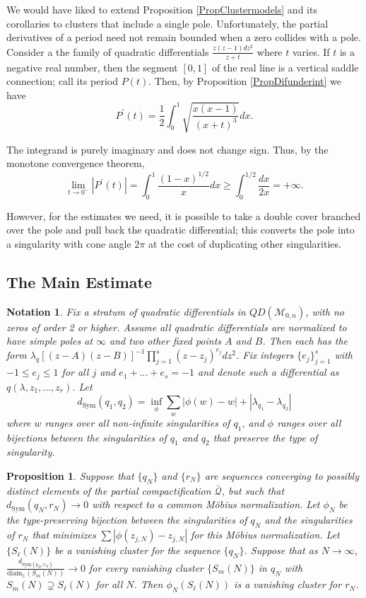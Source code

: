 \documentclass[12pt]{article}
\newtheorem{proposition}[theorem]{Proposition}
\newtheorem{notation}[theorem]{Notation}
\newcommand{\cc}{\mathbb{C}}
\newcommand{\diam}{\mathrm{diam}}
\begin{document}
\noindent We would have liked to extend Proposition \ref{PropClustermodels} and its corollaries to clusters that include a single pole. Unfortunately, the partial derivatives of a period need not remain bounded when a zero collides with a pole. Consider a the family of quadratic differentials $\frac{z(z-1)dz^2}{z + t}$ where $t$ varies. If $t$ is a negative real number, then the segment $[0,1]$ of the real line is a vertical saddle connection; call its period $P(t)$. Then, by Proposition \ref{PropDifunderint} we have $$P^\prime(t) = \frac{1}{2}\int_0^1 \sqrt{\frac{x(x-1)}{(x+t)^3}}dx.$$

\noindent The integrand is purely imaginary and does not change sign. Thus, by the monotone convergence theorem, $$\lim\limits_{t \to 0^-}|P^\prime(t)| = \int_0^1 \frac{(1-x)^{1/2}}{x}dx \geq \int_0^{1/2}\frac{dx}{2x} = +\infty.$$

\noindent However, for the estimates we need, it is possible to take a double cover branched over the pole and pull back the quadratic differential; this converts the pole into a singularity with cone angle $2\pi$ at the cost of duplicating other singularities.\\

\subsection{The Main Estimate}

\begin{notation}\label{NotaFixpoles} Fix a stratum of quadratic differentials in $QD(\mathcal{M}_{0,n})$, with no zeros of order 2 or higher. Assume all quadratic differentials are normalized to have simple poles at $\infty$ and two other fixed points $A$ and $B$. Then each has the form $\lambda_q[(z - A)(z - B)]^{-1}\prod_{j = 1}^s (z - z_j)^{e_j}dz^2$. Fix integers $\{e_j\}_{j = 1}^s$ with $-1 \leq e_j \leq 1$ for all $j$ and $e_1 + ... + e_s = -1$ and denote such a differential as $q(\lambda,z_1,...,z_r)$. Let $$d_\mathrm{Sym}(q_1,q_2) = \inf_\phi\sum_w|\phi(w) - w|+|\lambda_{q_1} - \lambda_{q_2}|$$ where $w$ ranges over all non-infinite singularities of $q_1$, and $\phi$ ranges over all bijections between the singularities of $q_1$ and $q_2$ that preserve the type of singularity.\end{notation}

\begin{proposition}\label{PropStableClust}Suppose that $\{q_N\}$ and $\{r_N\}$ are sequences converging to possibly distinct elements of the partial compactification $\bar{\mathcal{Q}}$, but such that $d_\mathrm{Sym}(q_N,r_N) \to 0$ with respect to a common M\"obius normalization. Let $\phi_N$ be the type-preserving bijection between the singularities of $q_N$ and the singularities of $r_N$ that minimizes $\sum |\phi(z_{j,N}) - z_{j,N}|$ for this M\"obius normalization. Let $\{S_\ell(N)\}$ be a vanishing cluster for the sequence $\{q_N\}$. Suppose that as $N \to \infty$, $\frac{d_{\mathrm{Sym}(q_N,r_N)}}{\diam_\cc(S_{m}(N))} \to 0$ for every vanishing cluster $\{S_m(N)\}$ in $q_N$ with $S_{m}(N) \supsetneq S_{\ell}(N)$ for all $N$. Then $\phi_N(S_\ell(N))$ is a vanishing cluster for $r_N$.\end{proposition}
\end{document}

